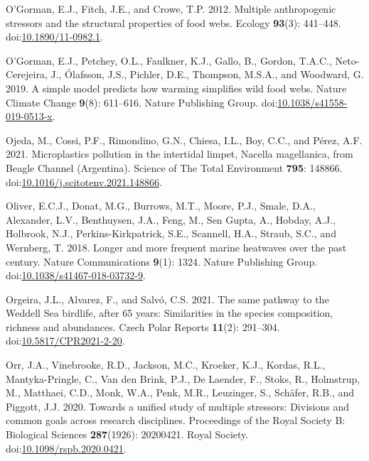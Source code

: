 \documentclass[
]{article}
\newlength{\cslhangindent}
\newenvironment{CSLReferences}[2] %
 {\begin{list}{}{%
  \setlength{\itemindent}{0pt}
  \setlength{\leftmargin}{0pt}
  \setlength{\parsep}{0pt}
  \ifodd #1
   \setlength{\leftmargin}{\cslhangindent}
   \setlength{\itemindent}{-1\cslhangindent}
  \fi
  \setlength{\itemsep}{#2\baselineskip}}}
 {\end{list}}
\begin{document}
\begin{CSLReferences}{1}{0}
O'Gorman, E.J., Fitch, J.E., and Crowe, T.P. 2012. Multiple
anthropogenic stressors and the structural properties of food webs.
Ecology \textbf{93}(3): 441--448.
doi:\href{https://doi.org/10.1890/11-0982.1}{10.1890/11-0982.1}.

O'Gorman, E.J., Petchey, O.L., Faulkner, K.J., Gallo, B., Gordon,
T.A.C., Neto-Cerejeira, J., Ólafsson, J.S., Pichler, D.E., Thompson,
M.S.A., and Woodward, G. 2019. A simple model predicts how warming
simplifies wild food webs. Nature Climate Change \textbf{9}(8):
611--616. Nature Publishing Group.
doi:\href{https://doi.org/10.1038/s41558-019-0513-x}{10.1038/s41558-019-0513-x}.

Ojeda, M., Cossi, P.F., Rimondino, G.N., Chiesa, I.L., Boy, C.C., and
Pérez, A.F. 2021. Microplastics pollution in the intertidal limpet,
{Nacella} magellanica, from {Beagle Channel} ({Argentina}). Science of
The Total Environment \textbf{795}: 148866.
doi:\href{https://doi.org/10.1016/j.scitotenv.2021.148866}{10.1016/j.scitotenv.2021.148866}.

Oliver, E.C.J., Donat, M.G., Burrows, M.T., Moore, P.J., Smale, D.A.,
Alexander, L.V., Benthuysen, J.A., Feng, M., Sen Gupta, A., Hobday,
A.J., Holbrook, N.J., Perkins-Kirkpatrick, S.E., Scannell, H.A., Straub,
S.C., and Wernberg, T. 2018. Longer and more frequent marine heatwaves
over the past century. Nature Communications \textbf{9}(1): 1324. Nature
Publishing Group.
doi:\href{https://doi.org/10.1038/s41467-018-03732-9}{10.1038/s41467-018-03732-9}.

Orgeira, J.L., Alvarez, F., and Salvó, C.S. 2021. The same pathway to
the {Weddell Sea} birdlife, after 65 years: Similarities in the species
composition, richness and abundances. Czech Polar Reports
\textbf{11}(2): 291--304.
doi:\href{https://doi.org/10.5817/CPR2021-2-20}{10.5817/CPR2021-2-20}.

Orr, J.A., Vinebrooke, R.D., Jackson, M.C., Kroeker, K.J., Kordas, R.L.,
Mantyka-Pringle, C., Van den Brink, P.J., De Laender, F., Stoks, R.,
Holmstrup, M., Matthaei, C.D., Monk, W.A., Penk, M.R., Leuzinger, S.,
Schäfer, R.B., and Piggott, J.J. 2020. Towards a unified study of
multiple stressors: Divisions and common goals across research
disciplines. Proceedings of the Royal Society B: Biological Sciences
\textbf{287}(1926): 20200421. Royal Society.
doi:\href{https://doi.org/10.1098/rspb.2020.0421}{10.1098/rspb.2020.0421}.


\end{CSLReferences}
\end{document}
